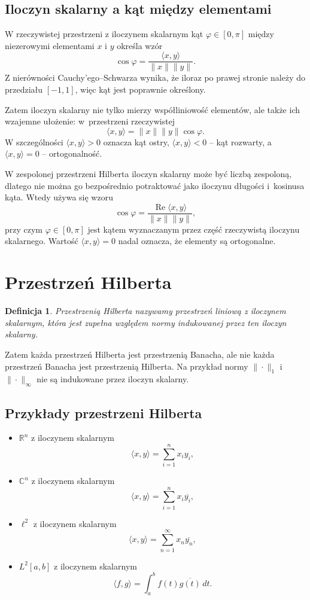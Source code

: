 \documentclass{article}
\newtheorem{definicja}{Definicja}
\begin{document}
\subsection{Iloczyn skalarny a kąt między elementami}
W rzeczywistej przestrzeni z iloczynem skalarnym kąt $\varphi\in[0,\pi]$ między niezerowymi elementami $x$ i $y$ określa wzór
\[
\cos\varphi
=\frac{\langle x,y\rangle}{\|x\|\|y\|}.
\]
Z nierówności Cauchy'ego--Schwarza wynika, że iloraz po prawej stronie należy do przedziału $[-1,1]$, więc kąt jest poprawnie określony.

Zatem iloczyn skalarny nie tylko mierzy współliniowość elementów, ale także ich wzajemne ułożenie: w~przestrzeni rzeczywistej
\[
\langle x,y\rangle=\|x\|\|y\|\cos\varphi.
\]
W szczególności $\langle x,y\rangle>0$ oznacza kąt ostry, $\langle x,y\rangle<0$ -- kąt rozwarty, a~$\langle x,y\rangle=0$ -- ortogonalność.

W zespolonej przestrzeni Hilberta iloczyn skalarny może być liczbą zespoloną, dlatego nie można go bezpośrednio potraktować jako iloczynu długości i~kosinusa kąta. Wtedy używa się wzoru
\[
\cos\varphi
=\frac{\operatorname{Re}\langle x,y\rangle}{\|x\|\|y\|},
\]
przy czym $\varphi\in[0,\pi]$ jest kątem wyznaczanym przez część rzeczywistą iloczynu skalarnego.
Wartość $\langle x,y\rangle=0$ nadal oznacza, że elementy są ortogonalne.

\section{Przestrzeń Hilberta}

\begin{definicja}
Przestrzenią Hilberta nazywamy przestrzeń liniową z iloczynem skalarnym, która jest zupełna względem normy indukowanej przez ten iloczyn skalarny.
\end{definicja}

Zatem każda przestrzeń Hilberta jest przestrzenią Banacha, ale nie każda przestrzeń Banacha jest przestrzenią Hilberta. Na przykład normy $\|\cdot\|_1$ i $\|\cdot\|_\infty$ nie są indukowane przez iloczyn skalarny.

\subsection{Przykłady przestrzeni Hilberta}
\begin{itemize}
    \item $\mathbb R^n$ z iloczynem skalarnym
    \[
    \langle x,y\rangle=\sum_{i=1}^n x_i y_i,
    \]
    \item $\mathbb C^n$ z iloczynem skalarnym
    \[
    \langle x,y\rangle=\sum_{i=1}^n x_i\overline{y_i},
    \]
    \item $\ell^2$ z iloczynem skalarnym
    \[
    \langle x,y\rangle=\sum_{n=1}^{\infty}x_n\overline{y_n},
    \]
    \item $L^2[a,b]$ z iloczynem skalarnym
    \[
    \langle f,g\rangle=\int_a^b f(t)\overline{g(t)}\,dt.
    \]
\end{itemize}
\end{document}

